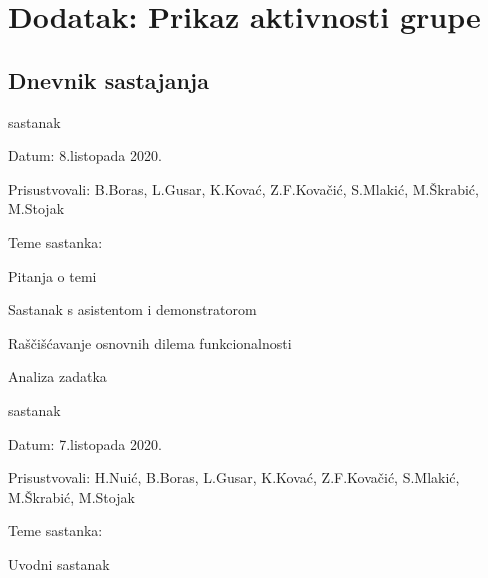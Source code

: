 \chapter*{Dodatak: Prikaz aktivnosti grupe}
		
		\section*{Dnevnik sastajanja\\}
		
		\begin{packed_enum}
			
		
			\item  sastanak
			
			\item[] \begin{packed_item}
				\item Datum:  8.listopada 2020.
				\item Prisustvovali: B.Boras, L.Gusar, K.Kovać, Z.F.Kovačić, S.Mlakić, M.Škrabić, M.Stojak
				\item Teme sastanka:
				\begin{packed_item}
					\item  Pitanja o temi
					\item  Sastanak s asistentom i demonstratorom
					\item  Raščišćavanje osnovnih dilema funkcionalnosti
					\item  Analiza zadatka\\
				\end{packed_item}
			\end{packed_item}

			\item  sastanak
		
			\item[] \begin{packed_item}
				\item Datum:  7.listopada 2020.
				\item Prisustvovali: H.Nuić, B.Boras, L.Gusar, K.Kovać, Z.F.Kovačić, S.Mlakić, M.Škrabić, M.Stojak
				\item Teme sastanka:
				\begin{packed_item}
					\item  Uvodni sastanak\\
				\end{packed_item}
			\end{packed_item}
		

\end{packed_enum}
